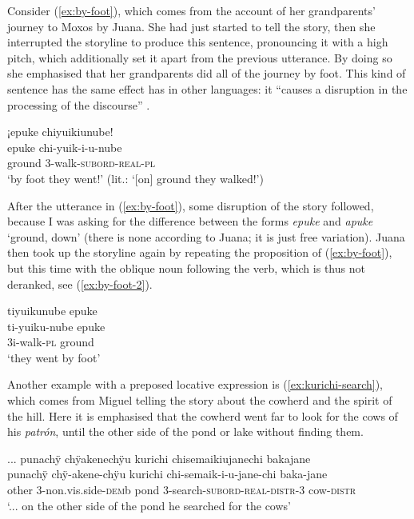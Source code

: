 Consider (\ref{ex:by-foot}), which comes from the account of her grandparents’ journey to Moxos by Juana. She had just started to tell the story, then she interrupted the storyline to produce this sentence, pronouncing it with a high pitch, which additionally set it apart from the previous utterance. By doing so she emphasised that her grandparents did all of the journey by foot. This kind of sentence has the same effect  has in other languages: it “causes a disruption in the processing of the discourse” \citep[39]{Westbury2016}.

\ea\label{ex:by-foot}
\begingl
\glpreamble ¡epuke chiyuikiunube!\\
\gla epuke chi-yuik-i-u-nube\\
\glb ground 3-walk-\textsc{subord}-\textsc{real}-\textsc{pl}\\
\glft ‘by foot they went!’ (lit.: ‘[on] ground they walked!’)
\endgl
\trailingcitation{[jxx-p151016l-2.022]}
\xe

After the utterance in (\ref{ex:by-foot}), some disruption of the story followed, because I was asking for the difference between the forms \textit{epuke} and \textit{apuke} ‘ground, down’ (there is none according to Juana; it is just free variation). Juana then took up the storyline again by repeating the proposition of (\ref{ex:by-foot}), but this time with the oblique noun following the verb, which is thus not deranked, see (\ref{ex:by-foot-2}).

\ea\label{ex:by-foot-2}
\begingl
\glpreamble tiyuikunube epuke\\
\gla ti-yuiku-nube epuke\\
\glb 3i-walk-\textsc{pl} ground\\
\glft ‘they went by foot’
\endgl
\trailingcitation{[jxx-p151016l-2.028]}
\xe

Another example with a preposed locative expression is (\ref{ex:kurichi-search}), which comes from Miguel telling the story about the cowherd and the spirit of the hill. Here it is emphasised that the cowherd went far to look for the cows of his \textit{patrón}, until the other side of the pond or lake without finding them.

\ea\label{ex:kurichi-search}
\begingl 
\glpreamble ... punachÿ chÿakenechÿu kurichi chisemaikiujanechi bakajane\\
\gla punachÿ chÿ-akene-chÿu kurichi chi-semaik-i-u-jane-chi baka-jane\\ 
\glb  other 3-non.vis.side-\textsc{dem}b pond 3-search-\textsc{subord}-\textsc{real}-\textsc{distr}-3 cow-\textsc{distr}\\ 
\glft ‘... on the other side of the pond he searched for the cows’\\ 
\endgl
\trailingcitation{[mxx-n151017l-1.15]}
\xe


